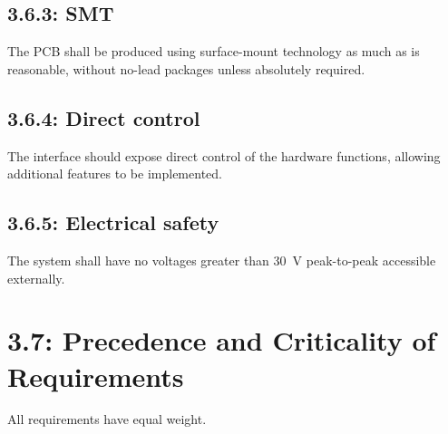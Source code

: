 \subsection*{3.6.3: SMT}
\label{prs:3.6.3}
The PCB shall be produced using surface-mount technology as much as is reasonable,
without no-lead packages unless absolutely required.

\subsection*{3.6.4: Direct control}
\label{prs:3.6.4}
The interface should expose direct control of the hardware functions, allowing additional
features to be implemented.

\subsection*{3.6.5: Electrical safety}
\label{prs:3.6.5}
The system shall have no voltages greater than $30$~V peak-to-peak accessible
externally.

\section*{3.7: Precedence and Criticality of Requirements}

All requirements have equal weight.
